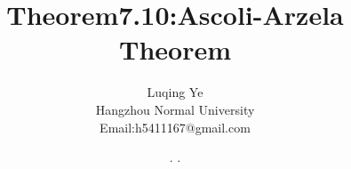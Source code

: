 \documentclass[a4paper, 12pt]{article} %
\makeatletter
\renewcommand{\maketitle}{ %
  \renewcommand\refname{参考文献}
  \newcommand{\D}{\displaystyle}\newcommand{\ri}{\Rightarrow}
  \newcommand{\ds}{\displaystyle} \renewcommand{\ni}{\noindent}
  \newcommand{\pa}{\partial} \newcommand{\Om}{\Omega}
  \newcommand{\om}{\omega} \newcommand{\sik}{\sum_{i=1}^k}
  \newcommand{\vov}{\Vert\omega\Vert} \newcommand{\Umy}{U_{\mu_i,y^i}}
  \newcommand{\lamns}{\lambda_n^{^{\scriptstyle\sigma}}}
  \newcommand{\chiomn}{\chi_{_{\Omega_n}}}
  \newcommand{\ullim}{\underline{\lim}} \newcommand{\bsy}{\boldsymbol}
  \newcommand{\mvb}{\mathversion{bold}} \newcommand{\la}{\lambda}
  \newcommand{\La}{\Lambda} \newcommand{\va}{\varepsilon}
  \newcommand{\be}{\beta} \newcommand{\al}{\alpha}
  \newcommand{\dis}{\displaystyle} \newcommand{\R}{{\mathbb R}}
  \newcommand{\N}{{\mathbb N}} \newcommand{\cF}{{\mathcal F}}
  \newcommand{\gB}{{\mathfrak B}} \newcommand{\eps}{\epsilon}
  \begin{flushright} %
    {\LARGE\@title} %
    
    \vspace{50pt} %
    
    {\large\@author} %
    \\\@date %
    
    \vspace{40pt} %
  \end{flushright}
}
\makeatother
\begin{document}
\begin{CJK}{UTF8}{gkai}
  \title{\textbf{Theorem7.10:Ascoli-Arzela Theorem}}
  \author{\small{Luqing Ye}\\{\small{Hangzhou Normal
        University}}\\{\small{Email:h5411167@gmail.com}}} %
  \renewcommand{\today}{\number\year. \number\month. \number\day}
  \date{\today} %
  
  
  
  \maketitle %
  
  
  
  
  
  
  

\end{CJK}
\end{document}
